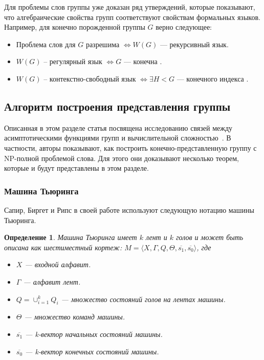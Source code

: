 \documentclass[14pt]{matmex-diploma-custom}
\newtheorem{defn}{Определение}[subsection]
\begin{document}
Для проблемы слов группы уже доказан ряд утверждений, которые показывают, что
алгебраические свойства групп соответствуют свойствам формальных языков. 
Например, для конечно порожденной группы $G$ верно следующее:
\begin{itemize}
    \item Проблема слов для $G$ разрешима $\iff W(G)$ --- рекурсивный язык. 
    \item $W(G)$ -- регулярный язык $\iff G$ --- конечна \cite{Anisimov}.
    \item $W(G)$ -- контекстно-свободный язык $\iff \exists H < G$ --- конечного индекса \cite{Muller}.
\end{itemize}

\subsection{Алгоритм построения представления группы}

Описанная в этом разделе статья посвящена исследованию связей
между асимптотическими функциями групп и вычислительной сложностью~\cite{Sapir}.
В частности, авторы показывают, как построить конечно-представленную группу
с NP-полной проблемой слова. Для этого они доказывают несколько теорем,
которые и будут представлены в этом разделе.

\subsubsection{Машина Тьюринга}

Сапир, Биргет и Рипс в своей работе \cite{Sapir} используют следующую нотацию машины Тьюринга.

\begin{defn} \label{tm}
Машина Тьюринга имеет $ k $ лент и $ k $ голов и может быть описана как шестиместный кортеж:
$M = \langle X, \Gamma, Q, \Theta, \overline{s_1}, \overline{s_0} \rangle$,
где
\begin{itemize}
    \item $X$ --- входной алфавит.
    \item $\Gamma$ --- алфавит лент.
    \item $Q = \cup_{i=1}^k Q_i$ --- множество состояний голов на лентах машины.
    \item $\Theta$ --- множество команд машины.
    \item $\overline{s_1}$ --- k-вектор начальных состояний машины.
    \item $\overline{s_0}$ --- k-вектор конечных состояний машины.
\end{itemize}
\end{defn}
\end{document}
